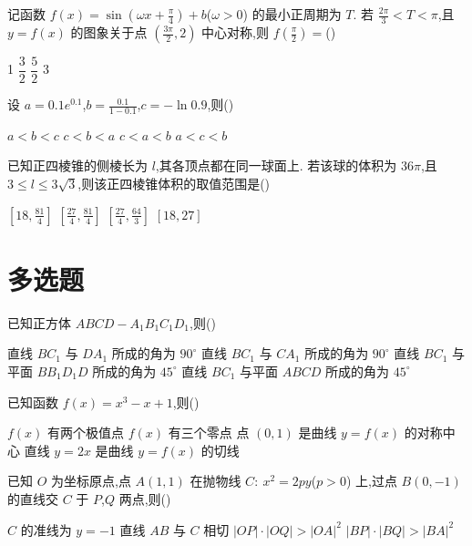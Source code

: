\begin{problem}
记函数 \(f(x)=\sin\left(\omega x+\frac{\pi}{4}\right)+b\)(\(\omega>0\)) 的最小正周期为 \(T\). 若 \(\frac{2\pi}{3}<T<\pi\),且 \(y=f(x)\) 的图象关于点 \(\left(\frac{3\pi}{2},2\right)\) 中心对称,则 \(f\left(\frac{\pi}{2}\right)=\)(\quad)

\choices
    {1}
    {\(\dfrac32\)}
    {\(\dfrac52\)}
    {3}
\end{problem}

\begin{problem}
设 \(a=0.1e^{0.1}\),\(b=\frac{0.1}{1-0.1}\),\(c=-\ln 0.9\),则(\quad)

\choices
    {\(a<b<c\)}
    {\(c<b<a\)}
    {\(c<a<b\)}
    {\(a<c<b\)}
\end{problem}

\begin{problem}
已知正四棱锥的侧棱长为 \(l\),其各顶点都在同一球面上. 若该球的体积为 \(36\pi\),且 \(3\le l\le 3\sqrt3\),则该正四棱锥体积的取值范围是(\quad)

\choices
    {\(\left[18,\frac{81}{4}\right]\)}
    {\(\left[\frac{27}{4},\frac{81}{4}\right]\)}
    {\(\left[\frac{27}{4},\frac{64}{3}\right]\)}
    {\([18,27]\)}
\end{problem}

\section{多选题}

\begin{problem}
已知正方体 \(ABCD-A_1B_1C_1D_1\),则(\quad)

\choices
    {直线 \(BC_1\) 与 \(DA_1\) 所成的角为 \(90^\circ\)}
    {直线 \(BC_1\) 与 \(CA_1\) 所成的角为 \(90^\circ\)}
    {直线 \(BC_1\) 与平面 \(BB_1D_1D\) 所成的角为 \(45^\circ\)}
    {直线 \(BC_1\) 与平面 \(ABCD\) 所成的角为 \(45^\circ\)}
\end{problem}

\begin{problem}
已知函数 \(f(x)=x^3-x+1\),则(\quad)

\choices
    {\(f(x)\) 有两个极值点}
    {\(f(x)\) 有三个零点}
    {点 \((0,1)\) 是曲线 \(y=f(x)\) 的对称中心}
    {直线 \(y=2x\) 是曲线 \(y=f(x)\) 的切线}
\end{problem}

\begin{problem}
已知 \(O\) 为坐标原点,点 \(A(1,1)\) 在抛物线 \(C:\ x^2=2py\)(\(p>0\)) 上,过点 \(B(0,-1)\) 的直线交 \(C\) 于 \(P\),\(Q\) 两点,则(\quad)

\choices
    {\(C\) 的准线为 \(y=-1\)}
    {直线 \(AB\) 与 \(C\) 相切}
    {\(|OP|\cdot |OQ|>|OA|^2\)}
    {\(|BP|\cdot |BQ|>|BA|^2\)}
\end{problem}

